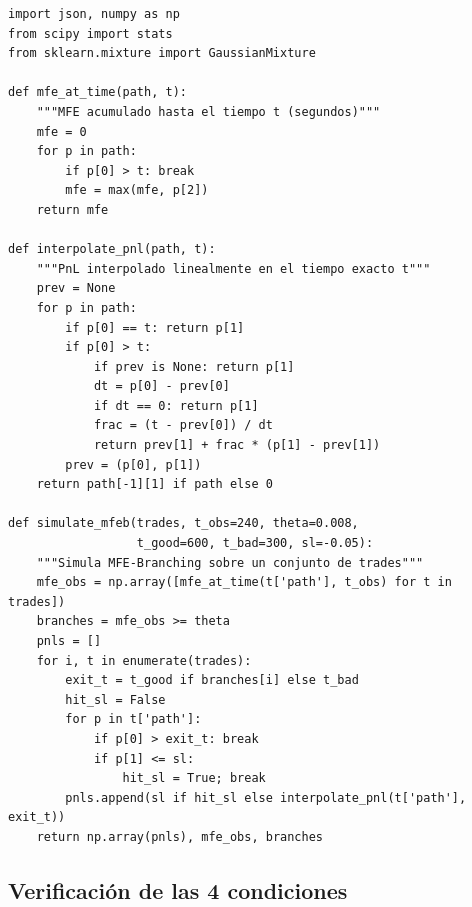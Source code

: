 \documentclass[11pt,a4paper]{article}
\begin{document}
\begin{lstlisting}[caption={Funciones fundamentales para MFE-Branching}]
import json, numpy as np
from scipy import stats
from sklearn.mixture import GaussianMixture
 
def mfe_at_time(path, t):
    """MFE acumulado hasta el tiempo t (segundos)"""
    mfe = 0
    for p in path:
        if p[0] > t: break
        mfe = max(mfe, p[2])
    return mfe
 
def interpolate_pnl(path, t):
    """PnL interpolado linealmente en el tiempo exacto t"""
    prev = None
    for p in path:
        if p[0] == t: return p[1]
        if p[0] > t:
            if prev is None: return p[1]
            dt = p[0] - prev[0]
            if dt == 0: return p[1]
            frac = (t - prev[0]) / dt
            return prev[1] + frac * (p[1] - prev[1])
        prev = (p[0], p[1])
    return path[-1][1] if path else 0
 
def simulate_mfeb(trades, t_obs=240, theta=0.008,
                  t_good=600, t_bad=300, sl=-0.05):
    """Simula MFE-Branching sobre un conjunto de trades"""
    mfe_obs = np.array([mfe_at_time(t['path'], t_obs) for t in trades])
    branches = mfe_obs >= theta
    pnls = []
    for i, t in enumerate(trades):
        exit_t = t_good if branches[i] else t_bad
        hit_sl = False
        for p in t['path']:
            if p[0] > exit_t: break
            if p[1] <= sl:
                hit_sl = True; break
        pnls.append(sl if hit_sl else interpolate_pnl(t['path'], exit_t))
    return np.array(pnls), mfe_obs, branches
\end{lstlisting}
 
\subsection{Verificación de las 4 condiciones}
 
\end{document}

